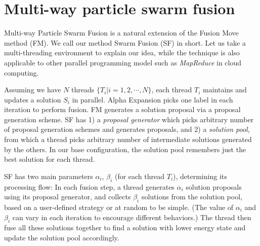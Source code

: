 \section{Multi-way particle swarm fusion} \label{section:algorithm}
Multi-way Particle Swarm Fusion is a natural extension of the Fusion
Move method (FM). We call our method Swarm Fusion (SF) in short. Let us
take a multi-threading environment to explain our idea, while the
technique is also applicable to other parallel programming model such as
{\it MapReduce} in cloud computing.
%

Assuming we have $N$ threads $\{T_i | i=1, 2, \cdots, N\}$, each thread
$T_i$ maintains and updates a solution $S_i$ in parallel. Alpha
Expansion picks one label in each iteration to perform fusion. FM
generates a solution proposal via a proposal generation scheme.
SF has 1) a {\it proposal generator} which picks
arbitrary number of proposal generation schemes and generates proposals,
and 2) a {\it solution pool}, from which a thread picks arbitrary number
of intermediate solutions generated by the others.
%
%
In our base configuration, the solution pool remembers just the best
solution for each thread.

SF has two main parameters $\alpha_i$, $\beta_i$ (for each thread
$T_i$), determining its processing flow: In each fusion step, a thread
generates $\alpha_i$ solution proposals using its proposal generator, and collects
$\beta_i$ solutions from the solution pool, based on a user-defined
strategy or at random to be simple. (The value of $\alpha_i$ and
$\beta_i$ can vary in each iteration to encourage different behaviors.)
The thread then fuse all these solutions together to find a solution
with lower energy state and update the solution pool accordingly.
%


